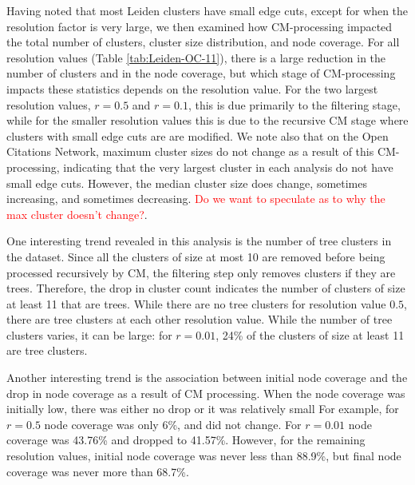\documentclass[11pt]{article}   	%
\begin{document}
Having noted that most Leiden clusters have small edge cuts, except for when the resolution factor is very large, we then examined how CM-processing impacted the total number of clusters, cluster size distribution, and node coverage.
For all resolution values (Table \ref{tab:Leiden-OC-11}), there is a large reduction in the number of clusters and in the node coverage, but which stage of CM-processing impacts these statistics depends on the resolution value.
For the  two largest resolution values, $r=0.5$ and $r=0.1$, this is
due primarily  to the filtering stage, while  for the smaller resolution values this is due to the recursive CM stage where clusters with small edge cuts are are modified. 
We note also that on the Open Citations Network,  maximum cluster sizes do not change as a result of this CM-processing, indicating that the very largest cluster in each analysis  do not have small edge cuts.  However, the median cluster size does change, sometimes increasing,  and sometimes decreasing. \textcolor{red}{Do we want to speculate as to why the max cluster doesn't change?}. 

One interesting trend revealed in this analysis is the number of tree clusters in the dataset.
Since all the clusters of size at most 10 are removed before being processed recursively by CM, the filtering step only removes clusters if they are trees.
Therefore, the drop in cluster count indicates the number of clusters of size at least 11 that are trees.
While there are no tree clusters for resolution value $0.5$,  there are tree clusters at each other resolution value.
While the number of tree clusters varies, it can be large:  for $r=0.01$, 24\% of the clusters of size at least 11 are tree clusters.

Another interesting trend is the association between initial node coverage and the drop in node coverage as a result of CM processing. When the node coverage was initially low, there was either no drop or it was relatively small For example, for $r=0.5$ node coverage was only 6\%, and did not change. For $r=0.01$ node coverage was 43.76\% and dropped to 41.57\%. However, for the remaining resolution values, initial node coverage was never less than 88.9\%, but final node coverage was never more than 68.7\%.
\end{document}
